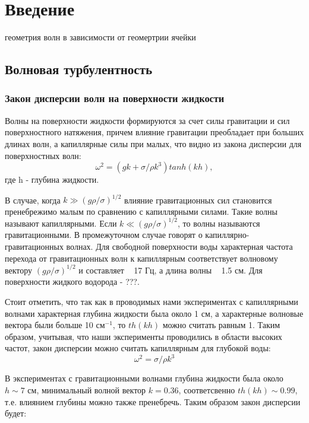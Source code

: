 \chapter{Введение} \label{chapt1}
геометрия волн в зависимости от геомертрии ячейки
\section{Волновая турбулентность} \label{sect1_1}
\subsection{Закон дисперсии волн на поверхности жидкости} \label{subsect1_1_1}

Волны на поверхности жидкости формируются за счет силы гравитации и сил поверхностного натяжения, причем влияние гравитации преобладает при больших длинах волн, а капиллярные силы при малых, что видно из закона дисперсии для поверхностных волн: 
\begin{equation}
 \label{eq:disper}
\omega^2 = (gk + \sigma/\rho k^3)tanh(kh),
\end{equation}
где h - глубина жидкости.

В случае, когда $k \gg (g\rho/\sigma)^{1/2}$ влияние гравитационных сил становится пренебрежимо малым по сравнению 
с капиллярными силами. Такие волны называют капиллярными. Если $k \ll (g\rho/\sigma)^{1/2}$, то волны называются 
гравитационными. В промежуточном случае говорят о капиллярно-гравитационных волнах. Для свободной поверхности воды 
характерная частота перехода от гравитационных волн к капиллярным соответствует волновому вектору $(g\rho/\sigma)^{1/2}$ и составляет ~ 17 Гц, а длина волны ~ 1.5 см. Для поверхности жидкого водорода - ???.

Стоит отметить, что так как в проводимых  нами экспериментах с капиллярными волнами характерная глубина жидкости была около 1 см, а характерные волновые вектора были больше 10 см$^{-1}$, то $th(kh)$ можно считать равным 1.
Таким образом, учитывая, что наши эксперименты проводились в области высоких частот, закон дисперсии можно считать капиллярным для глубокой воды:
\begin{equation}
 \label{eq:disperCap}
\omega^2 = \sigma/\rho k^3
\end{equation}

В экспериментах с гравитационными волнами глубина жидкости была около $ h \sim 7$ см, минимальный волной вектор $k = 0.36$, соответсвенно $th(kh) \sim 0.99$, т.е. влиянием глубины можно также пренебречь. Таким образом закон дисперсии будет:


